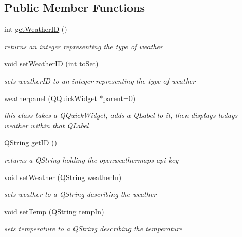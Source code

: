 \subsection*{Public Member Functions}
\begin{DoxyCompactItemize}
\item 
int \mbox{\hyperlink{classweatherpanel_a45e1d05896ce57be8a2485f7559c4276}{get\+Weather\+ID}} ()
\begin{DoxyCompactList}\small\item\em returns an integer representing the type of weather \end{DoxyCompactList}\item 
void \mbox{\hyperlink{classweatherpanel_adcfb5683fa421ee6b45b775ca3b6c5ae}{set\+Weather\+ID}} (int to\+Set)
\begin{DoxyCompactList}\small\item\em sets weather\+ID to an integer representing the type of weather \end{DoxyCompactList}\item 
\mbox{\hyperlink{classweatherpanel_a4f24bc46cb882bf72f7712a6aca35fbb}{weatherpanel}} (Q\+Quick\+Widget $\ast$parent=0)
\begin{DoxyCompactList}\small\item\em this class takes a Q\+Quick\+Widget, adds a Q\+Label to it, then displays todays weather within that Q\+Label \end{DoxyCompactList}\item 
Q\+String \mbox{\hyperlink{classweatherpanel_a6f90f234561aa11f374fbd6f89e4c02b}{get\+ID}} ()
\begin{DoxyCompactList}\small\item\em returns a Q\+String holding the openweathermaps api key \end{DoxyCompactList}\item 
void \mbox{\hyperlink{classweatherpanel_aa289deea2382682a44450048c5d8dafb}{set\+Weather}} (Q\+String weather\+In)
\begin{DoxyCompactList}\small\item\em sets weather to a Q\+String describing the weather \end{DoxyCompactList}\item 
void \mbox{\hyperlink{classweatherpanel_a3869138bae14bb7223e78541ddb45ae9}{set\+Temp}} (Q\+String temp\+In)
\begin{DoxyCompactList}\small\item\em sets temperature to a Q\+String describing the temperature \end{DoxyCompactList}\item 

\end{DoxyCompactItemize}
